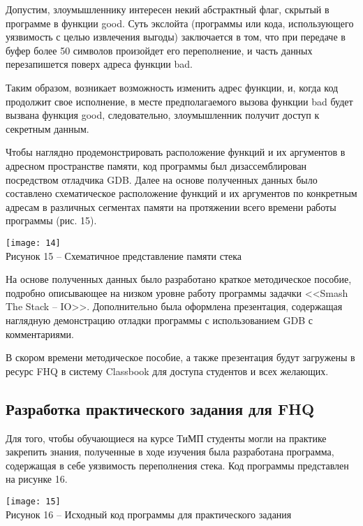 Допустим, злоумышленнику интересен некий абстрактный флаг, скрытый в программе в функции good. Суть экслойта (программы или кода, использующего уязвимость с целью извлечения выгоды) заключается в том, что при передаче в буфер более 50 символов произойдет его переполнение, и часть данных перезапишется поверх адреса функции bad.\par 
Таким образом, возникает возможность изменить адрес функции, и, когда код продолжит свое исполнение, в месте предполагаемого вызова функции bad будет вызвана функция good, следовательно, злоумышленник получит доступ к секретным данным.\par
Чтобы наглядно продемонстрировать расположение функций и их аргументов в адресном пространстве памяти, код программы был дизассемблирован посредством отладчика GDB. Далее на основе полученных данных было составлено схематическое расположение функций и их аргументов по конкретным адресам в различных сегментах памяти на протяжении всего времени работы программы (рис. 15).\par
\begin{center}
\texttt{[image: 14]}\\
Рисунок 15 -- Схематичное представление памяти стека\\
\end{center}
\vspace{\baselineskip}

На основе полученных данных было разработано краткое методическое пособие, подробно описывающее на низком уровне работу программы задачки <<Smash The Stack -- IO>>. Дополнительно была оформлена презентация, содержащая наглядную демонстрацию отладки программы с использованием GDB с комментариями.\par
В скором времени методическое пособие, а также презентация будут загружены в ресурс FHQ в систему Classbook для доступа студентов и всех желающих.\par
\vspace{\baselineskip}

\subsection{Разработка практического задания для FHQ}
Для того, чтобы обучающиеся на курсе ТиМП студенты могли на практике закрепить знания, полученные в ходе изучения была разработана программа, содержащая в себе уязвимость переполнения стека. Код программы представлен на рисунке 16.\par
\begin{center}
\texttt{[image: 15]}\\
Рисунок 16 -- Исходный код программы для практического задания\\
\end{center}
\vspace{\baselineskip}


